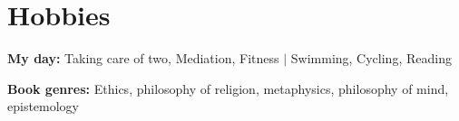
\section{Hobbies}

    \itemizeCVBegin

        \item{\textbf{My day:} Taking care of two, Mediation, Fitness $|$ Swimming, Cycling, Reading}
        \item{\textbf{Book genres:} Ethics, philosophy of religion, metaphysics, philosophy of mind, epistemology}
        
    \itemizeCVEnd
